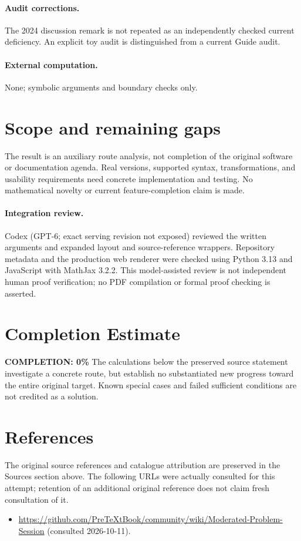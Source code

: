 \documentclass[11pt]{article}
\begin{document}
\paragraph{Audit corrections.} The 2024 discussion remark is not repeated as an independently checked current deficiency. An explicit toy audit is distinguished from a current Guide audit.
\paragraph{External computation.} None; symbolic arguments and boundary checks only.
\section{Scope and remaining gaps}
The result is an auxiliary route analysis, not completion of the original software or documentation agenda. Real versions, supported syntax, transformations, and usability requirements need concrete implementation and testing. No mathematical novelty or current feature-completion claim is made.
\paragraph{Integration review.} Codex (GPT-6; exact serving revision not exposed) reviewed the written arguments and expanded layout and source-reference wrappers. Repository metadata and the production web renderer were checked using Python 3.13 and JavaScript with MathJax 3.2.2. This model-assisted review is not independent human proof verification; no PDF compilation or formal proof checking is asserted.

\section{Completion Estimate}
\noindent\textbf{COMPLETION: 0\%}
The calculations below the preserved source statement investigate a concrete route,
but establish no substantiated new progress toward the entire original target.
Known special cases and failed sufficient conditions are not credited as a solution.
\section{References}
The original source references and catalogue attribution are preserved in the
Sources section above. The following URLs were actually consulted for this attempt;
retention of an additional original reference does not claim fresh consultation of it.
\begin{itemize}
\item \url{https://github.com/PreTeXtBook/community/wiki/Moderated-Problem-Session} (consulted 2026-10-11). 
\end{itemize}
\end{document}
